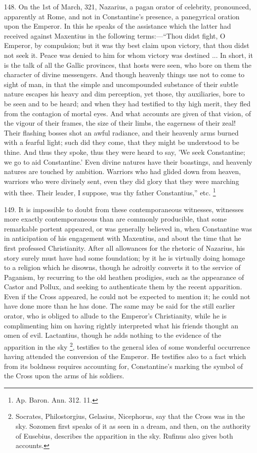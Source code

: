 148.
On the 1st of March, 321, Nazarius, a pagan orator of celebrity,
pronounced, apparently at Rome, and not in Constantine's presence, a
panegyrical oration upon the Emperor. In this he speaks of the
assistance which the latter had received against Maxentius in the
following terms:—``Thou didst fight, O Emperor, by compulsion; but it
was thy best claim upon victory, that thou didst not seek it. Peace
was denied to him for whom victory was destined ... In short, it is
the talk of all the Gallic provinces, that hosts were seen, who bore
on them the character of divine messengers. And though heavenly things
use not to come to sight of man, in that the simple and uncompounded
substance of their subtle nature escapes his heavy and dim perception,
yet those, thy auxiliaries, bore to be seen and to be heard; and when
they had testified to thy high merit, they fled from the contagion of
mortal eyes. And what accounts are given of that vision, of the vigour
of their frames, the size of their limbs, the eagerness of their zeal!
Their flashing bosses shot an awful radiance, and their heavenly arms
burned with a fearful light; such did they come, that they might be
understood to be thine. And thus they spoke, thus they were heard to
say, 'We seek Constantine; we go to aid Constantine.' Even divine
natures have their boastings, and heavenly natures are touched by
ambition. Warriors who had glided down from heaven, warriors who were
divinely sent, even they did glory that they were marching with
thee. Their leader, I suppose, was thy father Constantius,'' etc. \footnote{Ap. Baron. Ann. 312. 11.}

149.
It is impossible to doubt from these contemporaneous witnesses,
witnesses more exactly contemporaneous than are commonly producible,
that some remarkable portent appeared, or was generally believed in,
when Constantine was in anticipation of his engagement with Maxentius,
and about the time that he first professed Christianity. After all
allowances for the rhetoric of Nazarius, his story surely must have
had some foundation; by it he is virtually doing homage to a religion
which he disowns, though he adroitly converts it to the service of
Paganism, by recurring to the old heathen prodigies, such as the
appearance of Castor and Pollux, and seeking to authenticate them by
the recent apparition. Even if the Cross appeared, he could not be
expected to mention it; he could not have done more than he has done.
The same may be said for the still earlier orator, who is obliged to
allude to the Emperor's Christianity, while he is complimenting him on
having rightly interpreted what his friends thought an omen of evil.
Lactantius, though he adds nothing to the evidence of the apparition
in the sky \footnote{Socrates, Philostorgius, Gelasius, Nicephorus, say that the Cross was
in the sky. Sozomen first speaks of it as seen in a dream, and then,
on the authority of Eusebius, describes the apparition in the sky.
Rufinus also gives both accounts.}, testifies
to the general idea of some wonderful occurrence having attended
the conversion of the Emperor. He testifies also to a fact which from
its boldness requires accounting for, Constantine's marking the symbol
of the Cross upon the arms of his soldiers.

